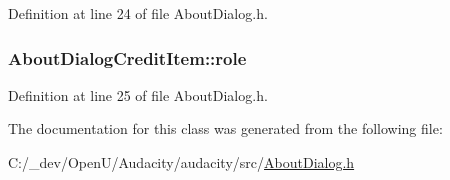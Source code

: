 Definition at line 24 of file About\+Dialog.\+h.

\subsubsection[{\texorpdfstring{role}{role}}]{ About\+Dialog\+Credit\+Item\+::role}\hypertarget{struct_about_dialog_credit_item_a3690d14cfe63ae75f7c1235fda7b8f1d}{}\label{struct_about_dialog_credit_item_a3690d14cfe63ae75f7c1235fda7b8f1d}


Definition at line 25 of file About\+Dialog.\+h.



The documentation for this class was generated from the following file\+:\begin{DoxyCompactItemize}
\item 
C\+:/\+\_\+dev/\+Open\+U/\+Audacity/audacity/src/\hyperlink{_about_dialog_8h}{About\+Dialog.\+h}\end{DoxyCompactItemize}
